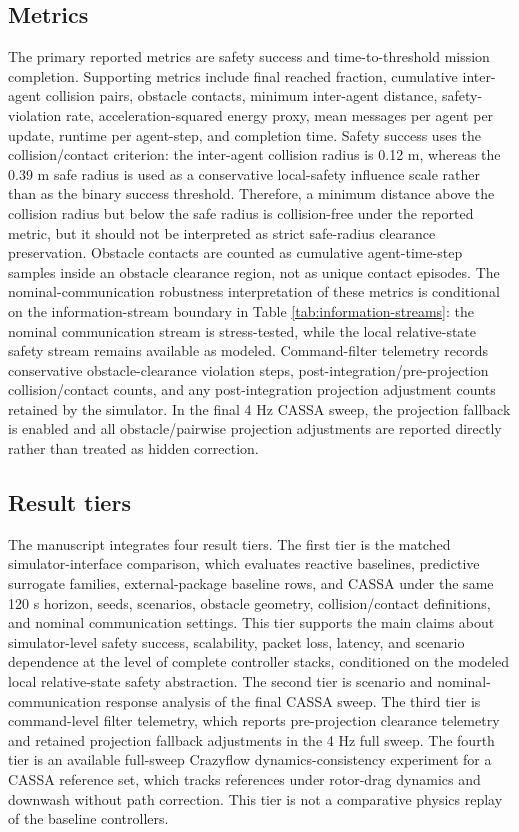 \documentclass[11pt]{article}
\begin{document}
\subsection{Metrics}

The primary reported metrics are safety success and time-to-threshold mission completion. Supporting metrics include final reached fraction, cumulative inter-agent collision pairs, obstacle contacts, minimum inter-agent distance, safety-violation rate, acceleration-squared energy proxy, mean messages per agent per update, runtime per agent-step, and completion time. Safety success uses the collision/contact criterion: the inter-agent collision radius is 0.12 m, whereas the 0.39 m safe radius is used as a conservative local-safety influence scale rather than as the binary success threshold. Therefore, a minimum distance above the collision radius but below the safe radius is collision-free under the reported metric, but it should not be interpreted as strict safe-radius clearance preservation. Obstacle contacts are counted as cumulative agent-time-step samples inside an obstacle clearance region, not as unique contact episodes. The nominal-communication robustness interpretation of these metrics is conditional on the information-stream boundary in Table \ref{tab:information-streams}: the nominal communication stream is stress-tested, while the local relative-state safety stream remains available as modeled. Command-filter telemetry records conservative obstacle-clearance violation steps, post-integration/pre-projection collision/contact counts, and any post-integration projection adjustment counts retained by the simulator. In the final 4 Hz CASSA sweep, the projection fallback is enabled and all obstacle/pairwise projection adjustments are reported directly rather than treated as hidden correction.

\subsection{Result tiers}

The manuscript integrates four result tiers. The first tier is the matched simulator-interface comparison, which evaluates reactive baselines, predictive surrogate families, external-package baseline rows, and CASSA under the same 120 s horizon, seeds, scenarios, obstacle geometry, collision/contact definitions, and nominal communication settings. This tier supports the main claims about simulator-level safety success, scalability, packet loss, latency, and scenario dependence at the level of complete controller stacks, conditioned on the modeled local relative-state safety abstraction. The second tier is scenario and nominal-communication response analysis of the final CASSA sweep. The third tier is command-level filter telemetry, which reports pre-projection clearance telemetry and retained projection fallback adjustments in the 4 Hz full sweep. The fourth tier is an available full-sweep Crazyflow dynamics-consistency experiment for a CASSA reference set, which tracks references under rotor-drag dynamics and downwash without path correction. This tier is not a comparative physics replay of the baseline controllers.
\end{document}
